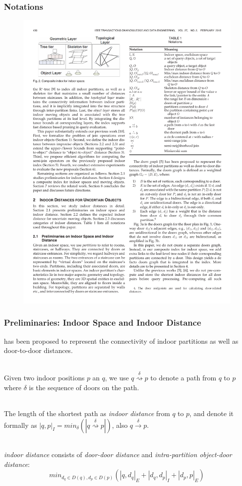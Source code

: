 \begin{frame}
\frametitle{Notations}

\vspace{-15pt}
\begin{figure}[tb]
  \includegraphics[width=0.57\columnwidth]{figures/2-7/2-7-1.pdf}
\end{figure}

\end{frame}


\begin{frame}
\frametitle{Preliminaries: Indoor Space and Indoor Distance}

 has been proposed to represent the connectivity of indoor partitions as well as door-to-door distances.~\cite{DBLP:conf/edbt/YangLJ10}\\~\\\pause

Given two indoor positions $p$ an $q$, we use $q \overset{\delta}{\rightsquigarrow} p$ to denote a path from $q$ to $p$ where $\delta$ is the sequence of doors on the path.\\~\\\pause

The length of the shortest path as \emph{indoor distance} from $q$ to $p$, and denote it formally as $|q, p|_{I} = min_{\delta}(|q \overset{\delta}{\rightsquigarrow} p|)$, also $q \overset{\delta}{\rightarrow} p$.\\~\\\pause

\emph{indoor distance} consists of \emph{door-door distance} and \emph{intra-partition object-door distance}:\pause
\begin{equation}
  min_{d_q \in D(q), d_p \in D(p)}(|q, d_q|_{E} + |d_q, d_p|_{I} + |d_p, p|_{E})
\end{equation}

\end{frame}

